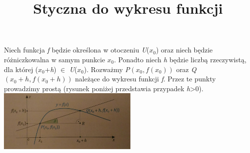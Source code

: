 \documentclass[12pt]{article}
\title{Styczna do wykresu funkcji}
\date{}
\begin{document}
\maketitle
\noindent
Niech funkcja \textit{f} będzie określona w otoczeniu \textit{U}($x_{0}$) oraz niech będzie różniczkowalna w samym punkcie $x_0$. Ponadto niech \textit{h} będzie liczbą rzeczywistą, dla której ($x_0$+\textit{h}) $\in$ \textit{U}($x_{0}$). Rozważmy \textit{P}$\left(x_0, f(x_0)\right)$ oraz \textit{Q}$\left(x_0+h, f(x_0+h)\right)$ należące do wykresu funkcji \textit{f}. Przez te punkty prowadzimy prostą (rysunek poniżej przedstawia przypadek \textit{h}>0).
\includegraphics[height=3cm]{zdj1.jpg}
\end{document}
